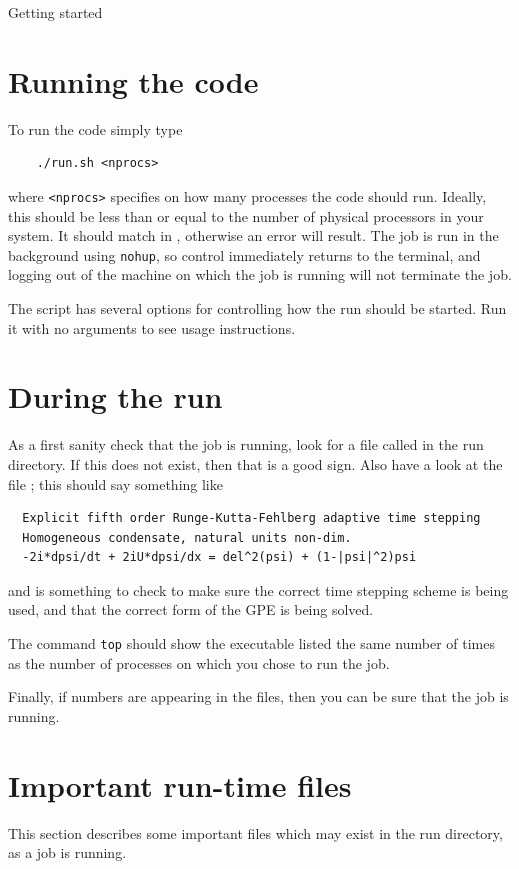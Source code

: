 \begin{chapter}{\label{cha:quickstart}Getting started}
  \section{Running the code}
  To run the code simply type
  \begin{Verbatim}
    ./run.sh <nprocs>
  \end{Verbatim}
  where \verb"<nprocs>" specifies on how many processes the code should run.
  Ideally, this should be less than or equal to the number of physical
  processors in your system.  It should match  in
  , otherwise an error will result.  The job is run in
  the background using \verb"nohup", so control immediately returns to the
  terminal, and logging out of the machine on which the job is running will not
  terminate the job.

  The  script has several options for controlling how the run
  should be started.  Run it with no arguments to see usage instructions.

  \section{During the run}
  As a first sanity check that the job is running, look for a file called
   in the run directory.  If this does not exist, then that is a
  good sign.  Also have a look at the file ; this should say
  something like
  \begin{Verbatim}
  Explicit fifth order Runge-Kutta-Fehlberg adaptive time stepping
  Homogeneous condensate, natural units non-dim.
  -2i*dpsi/dt + 2iU*dpsi/dx = del^2(psi) + (1-|psi|^2)psi
  \end{Verbatim}
  and is something to check to make sure the correct time stepping scheme is
  being used, and that the correct form of the GPE is being solved.

  The command \verb"top" should show the  executable listed the
  same number of times as the number of processes on which you chose to run the
  job.

  Finally, if numbers are appearing in the  files, then you can
  be sure that the job is running.

  \section{Important run-time files}
  This section describes some important files which may exist in the run
  directory, as a job is running.


\end{chapter}
